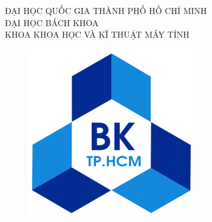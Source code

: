\documentclass[a4paper]{article}
\begin{document}
	
	\begin{titlepage}
		\begin{center}
			\large{ĐẠI HỌC QUỐC GIA THÀNH PHỐ HỒ CHÍ MINH\\
				ĐẠI HỌC BÁCH KHOA  \\
				KHOA KHOA HỌC VÀ KĨ THUẬT MÁY TÍNH}
		\end{center}
		
		\vspace{1cm}
		
		\begin{figure}[h!]
			\begin{center}
				\includegraphics[scale = 0.4]{hcmut.png}
			\end{center}
		\end{figure}
		
		\vspace{1cm}
		

\end{titlepage}
\end{document}
